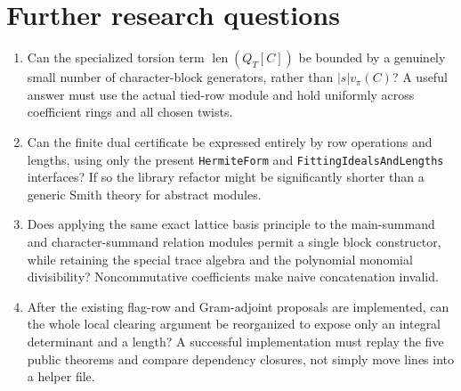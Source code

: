 \documentclass[11pt]{article}
\newcommand{\len}{\operatorname{len}}
\newcommand{\val}{v_\pi}
\begin{document}
\section{Further research questions}
\begin{enumerate}
\item Can the specialized torsion term $\len(Q_T[C])$ be bounded by a genuinely small number of character-block generators, rather than $|s|\val(C)$? A useful answer must use the actual tied-row module and hold uniformly across coefficient rings and all chosen twists.
\item Can the finite dual certificate be expressed entirely by row operations and lengths, using only the present \texttt{HermiteForm} and \texttt{FittingIdealsAndLengths} interfaces? If so the library refactor might be significantly shorter than a generic Smith theory for abstract modules.
\item Does applying the same exact lattice basis principle to the main-summand and character-summand relation modules permit a single block constructor, while retaining the special trace algebra and the polynomial monomial divisibility? Noncommutative coefficients make naive concatenation invalid.
\item After the existing flag-row and Gram-adjoint proposals are implemented, can the whole local clearing argument be reorganized to expose only an integral determinant and a length? A successful implementation must replay the five public theorems and compare dependency closures, not simply move lines into a helper file.
\end{enumerate}
\end{document}
